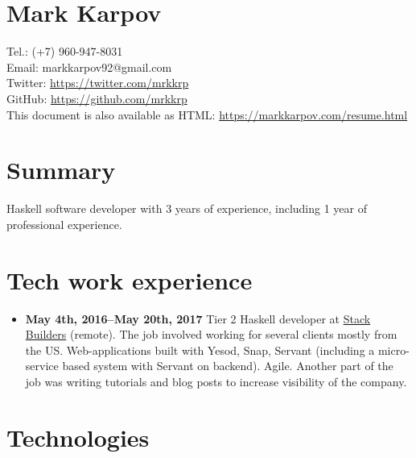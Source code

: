 \documentclass[a4paper,12pt]{article}
\begin{document}

\section*{Mark Karpov}

Tel.: (+7) 960-947-8031\\
Email: markkarpov92@gmail.com\\
Twitter: \href{https://twitter.com/mrkkrp}{https://twitter.com/mrkkrp}\\
GitHub: \href{https://github.com/mrkkrp}{https://github.com/mrkkrp}\\
This document is also available as HTML: \href{https://markkarpov.com/resume.html}{https://markkarpov.com/resume.html}

\sectionfont{\fontsize{12}{15}\selectfont\sectionrule{0pt}{0pt}{-5pt}{0.8pt}}

\section*{Summary}

Haskell software developer with 3 years of experience, including 1 year of
professional experience.

\section*{Tech work experience}

\begin{itemize}[noitemsep]
\item \textbf{May 4th, 2016--May 20th, 2017} Tier 2 Haskell developer at
  \href{https://www.stackbuilders.com/}{Stack Builders} (remote). The job
  involved working for several clients mostly from the US. Web-applications
  built with Yesod, Snap, Servant (including a micro-service based system
  with Servant on backend). Agile. Another part of the job was writing
  tutorials and blog posts to increase visibility of the company.
\end{itemize}

\section*{Technologies}
\end{document}
